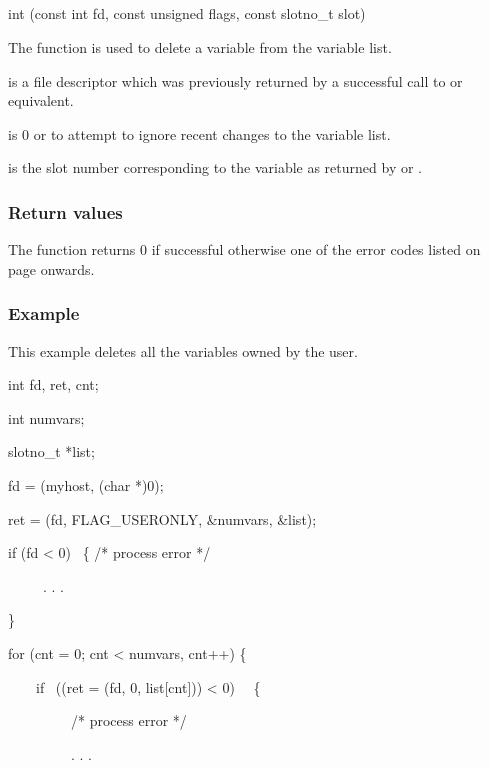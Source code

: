 \subsection{\funcnameXBvardel{}}

\begin{expara}

int \funcnameXBvardel{}(const int fd, const unsigned flags, const slotno\_t
slot)

\end{expara}

The function \funcXBvardel{} is used to delete a
variable from the variable list.

 is a file descriptor which was previously
returned by a successful call to \funcXBopen{} or equivalent.

 is 0 or
 to attempt to ignore recent
changes to the variable list.

 is the slot number corresponding to the
variable as returned by \funcXBvarlist{} or
\funcXBvarfindslot{}.

\subsubsection{Return values}
The function returns 0 if successful otherwise one of the error codes
listed on page \pageref{errorcodes} onwards.

\subsubsection{Example}
This example deletes all the variables owned by the user.

\begin{expara}

int fd, ret, cnt;

int numvars;

slotno\_t *list;

\bigskip


fd = \funcnameXBopen{}({\textquotedbl}myhost{\textquotedbl}, (char *)0);

ret = \funcnameXBvarlist{}(fd, \constprefix{}FLAG\_USERONLY, \&numvars, \&list);

if (fd {\textless} 0) \ \{ /* process error */

\ \ \ \ \ . . .

\}

\bigskip


for (cnt = 0; cnt {\textless} numvars, cnt++) \{

\ \ \ \ if \ ((ret = \funcnameXBvardel{}(fd, 0, list[cnt])) {\textless} 0)
\ \ \{

\ \ \ \ \ \ \ \ \ /* process error */

\ \ \ \ \ \ \ \ \ . . .

\ \ \ \ \

\end{expara}

